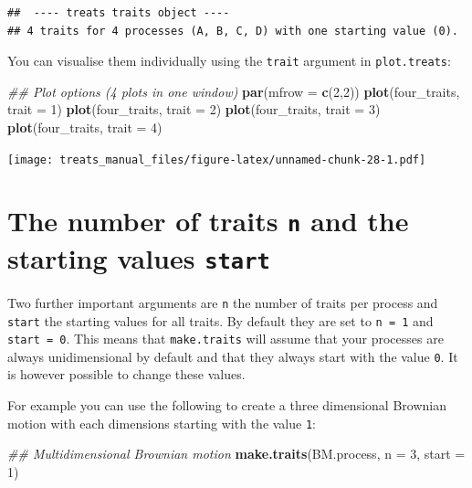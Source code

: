 \documentclass[
]{book}
\newenvironment{Shaded}{\begin{snugshade}}{\end{snugshade}}
\newcommand{\CommentTok}[1]{\textcolor[rgb]{0.56,0.35,0.01}{\textit{#1}}}
\newcommand{\DataTypeTok}[1]{\textcolor[rgb]{0.13,0.29,0.53}{#1}}
\newcommand{\DecValTok}[1]{\textcolor[rgb]{0.00,0.00,0.81}{#1}}
\newcommand{\KeywordTok}[1]{\textcolor[rgb]{0.13,0.29,0.53}{\textbf{#1}}}
\newcommand{\NormalTok}[1]{#1}
\begin{document}
\begin{verbatim}
##  ---- treats traits object ---- 
## 4 traits for 4 processes (A, B, C, D) with one starting value (0).
\end{verbatim}

You can visualise them individually using the \texttt{trait} argument in \texttt{plot.treats}:

\begin{Shaded}
\begin{Highlighting}[]
\CommentTok{\#\# Plot options (4 plots in one window)}
\KeywordTok{par}\NormalTok{(}\DataTypeTok{mfrow =} \KeywordTok{c}\NormalTok{(}\DecValTok{2}\NormalTok{,}\DecValTok{2}\NormalTok{))}
\KeywordTok{plot}\NormalTok{(four\_traits, }\DataTypeTok{trait =} \DecValTok{1}\NormalTok{)}
\KeywordTok{plot}\NormalTok{(four\_traits, }\DataTypeTok{trait =} \DecValTok{2}\NormalTok{)}
\KeywordTok{plot}\NormalTok{(four\_traits, }\DataTypeTok{trait =} \DecValTok{3}\NormalTok{)}
\KeywordTok{plot}\NormalTok{(four\_traits, }\DataTypeTok{trait =} \DecValTok{4}\NormalTok{)}
\end{Highlighting}
\end{Shaded}

\texttt{[image: treats\_manual\_files/figure-latex/unnamed-chunk-28-1.pdf]}

\hypertarget{the-number-of-traits-n-and-the-starting-values-start}{%
\section{\texorpdfstring{The number of traits \texttt{n} and the starting values \texttt{start}}{The number of traits n and the starting values start}}\label{the-number-of-traits-n-and-the-starting-values-start}}

Two further important arguments are \texttt{n} the number of traits per process and \texttt{start} the starting values for all traits.
By default they are set to \texttt{n\ =\ 1} and \texttt{start\ =\ 0}.
This means that \texttt{make.traits} will assume that your processes are always unidimensional by default and that they always start with the value \texttt{0}.
It is however possible to change these values.

For example you can use the following to create a three dimensional Brownian motion with each dimensions starting with the value \texttt{1}:

\begin{Shaded}
\begin{Highlighting}[]
\CommentTok{\#\# Multidimensional Brownian motion}
\KeywordTok{make.traits}\NormalTok{(BM.process, }\DataTypeTok{n =} \DecValTok{3}\NormalTok{, }\DataTypeTok{start =} \DecValTok{1}\NormalTok{)}
\end{Highlighting}
\end{Shaded}
\end{document}
